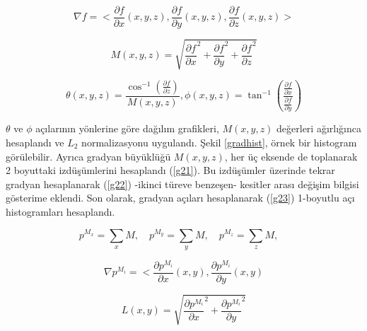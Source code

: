 \documentclass[conference]{IEEEtran}
\begin{document}
\begin{equation}
\nabla f = <\frac{\partial f}{\partial x} (x,y,z),
			\frac{\partial f}{\partial y} (x,y,z),
			\frac{\partial f}{\partial z} (x,y,z)>
\label{eqg1}
\end{equation}

\begin{equation}
M(x, y, z) = \sqrt{\frac{\partial f}{\partial x}^2 + \frac{\partial f}{\partial y}^2 + \frac{\partial f}{\partial z}^2}
\label{eqg2}
\end{equation}

\begin{equation}
\theta(x, y, z) = \frac{\cos^{-1}(\frac{\partial f}{\partial z})}{M(x, y, z)}, \phi(x, y, z) = \tan^{-1}(\frac{\frac{\partial f}{\partial x}}{\frac{\partial f}{\partial y}})
\label{eqg3}
\end{equation}

$\theta$ ve $\phi$ açılarının yönlerine göre dağılım grafikleri, $M(x, y, z)$ değerleri ağırlığınca hesaplandı ve $L_2$ \cite{dalal2005} normalizasyonu uygulandı. Şekil \ref{gradhist}, örnek bir histogram görülebilir. Ayrıca gradyan büyüklüğü $M(x, y, z)$, her üç eksende de toplanarak 2 boyuttaki izdüşümlerini hesaplandı (\ref{g21}). Bu izdüşümler üzerinde tekrar gradyan hesaplanarak (\ref{g22}) -ikinci türeve benzeşen- kesitler arası değişim bilgisi gösterime eklendi. Son olarak, gradyan açıları hesaplanarak (\ref{g23}) 1-boyutlu açı histogramları hesaplandı.
 
 \begin{equation}
 p^{M_x} = \sum_x{M}, \quad
 p^{M_y} = \sum_y{M}, \quad
 p^{M_z} = \sum_z{M}, \quad
\label{g21}
\end{equation}

\begin{equation}
\nabla p^{M_i} = <\frac{\partial p^{M_i}}{\partial x} (x,y),
			\frac{\partial p^{M_i}}{\partial y} (x,y)
\label{g22}
\end{equation}

\begin{equation}
L(x, y) = \sqrt{\frac{\partial p^{M_i}}{\partial x}^2 + \frac{\partial p^{M_i}}{\partial y}^2}
\label{g23}
\end{equation}
\end{document}
